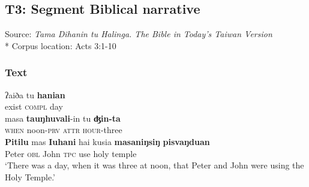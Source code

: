 \documentclass[output=paper
,modfonts
,nonflat]{langsci/langscibook}
\begin{document}
\subsection*{T3: Segment Biblical narrative}

Source: \textit{Tama Dihanin tu Halinga. The  Bible in Today’s Taiwan  Version} \citep{Bible2000}\\*
Corpus location: Acts 3:1-10

\subsubsection*{Text}

\begin{exe}
	\label{tx3-1}
	\begin{xlist}
		\ex\label{tx3-1a}
		\gll ʔaiða  tu  \textbf{hanian}\\
		exist  \textsc{compl}  day\\
		\ex\label{tx3-1b}
		\gll masa  \textbf{tauŋhuvali}-in  tu  \textbf{ʤin-ta}\\
		\textsc{when}  noon-\textsc{prv}  \textsc{attr}  \textsc{hour}-three\\
		\ex\label{tx3-1c}
		\gll \textbf{Pitilu}  mas  \textbf{Iuhani}  hai  kusia  \textbf{masaniŋsiŋ} \textbf{pisvaŋduan}\\
		Peter  \textsc{obl}  John  \textsc{tpc}  use  holy  temple\\
		\glt `There was a day, when it was three at noon, that Peter and John were using the Holy Temple.’
	\end{xlist}
\end{exe}
\end{document}
